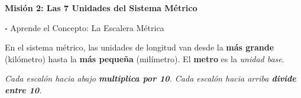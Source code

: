 \documentclass[12pt, letterpaper]{article}
\newcommand{\mision}[2]{%
	\needspace{4cm}%
	\vspace{5pt}%
	\begin{tcolorbox}[
		enhanced,
		colback  = #1,
		colframe = #1!60!black,
		arc=3mm, boxrule=1.5pt,
		left=6pt, right=6pt, top=5pt, bottom=5pt,
		]
		{\large\bfseries\color{white} #2}
	\end{tcolorbox}%
	\vspace{2pt}%
}
\begin{document}
	\newpage
	
	\mision{valblue}{Misión 2: Las 7 Unidades del Sistema Métrico}
	
	\begin{concepto}{$\square$ Aprende el Concepto: La Escalera Métrica}
		
		En el sistema métrico, las unidades de longitud van desde la
		\textbf{más grande} (kilómetro) hasta la \textbf{más pequeña}
		(milímetro). El \textbf{metro} es la \textit{unidad base}.
		
		\vspace{6pt}
		\textit{Cada escalón hacia abajo \textbf{multiplica por 10}.
			Cada escalón hacia arriba \textbf{divide entre 10}.}
	\end{concepto}
	
	\vspace{4pt}
	
\end{document}
